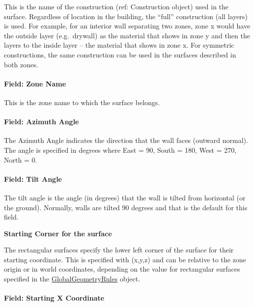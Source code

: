 This is the name of the construction (ref: Construction object) used in the surface. Regardless of location in the building, the ``full'' construction (all layers) is used. For example, for an interior wall separating two zones, zone x would have the outside layer (e.g.~drywall) as the material that shows in zone y and then the layers to the inside layer -- the material that shows in zone x. For symmetric constructions, the same construction can be used in the surfaces described in both zones.

\paragraph{Field: Zone Name}\label{field-zone-name-012}

This is the zone name to which the surface belongs.

\paragraph{Field: Azimuth Angle}

The Azimuth Angle indicates the direction that the wall faces (outward normal). The angle is specified in degrees where East = 90, South = 180, West = 270, North = 0.

\paragraph{Field: Tilt Angle}

The tilt angle is the angle (in degrees) that the wall is tilted from horizontal (or the ground). Normally, walls are tilted 90 degrees and that is the default for this field.

\begin{callout}
\textbf{Starting Corner for the surface}

The rectangular surfaces specify the lower left corner of the surface for their starting coordinate. This is specified with (x,y,z) and can be relative to the zone origin or in world coordinates, depending on the value for rectangular surfaces specified in the \hyperref[globalgeometryrules]{GlobalGeometryRules} object.
\end{callout}

\paragraph{Field: Starting X Coordinate}\label{field-starting-x-coordinate}

